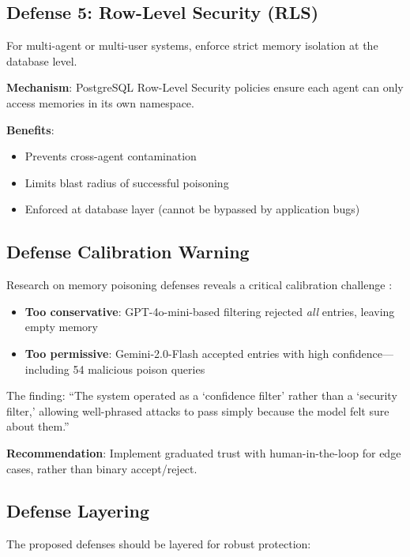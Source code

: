 \subsection{Defense 5: Row-Level Security (RLS)}

For multi-agent or multi-user systems, enforce strict memory isolation at the database level.

\textbf{Mechanism}: PostgreSQL Row-Level Security policies ensure each agent can only access memories in its own namespace.

\textbf{Benefits}:
\begin{itemize}
    \item Prevents cross-agent contamination
    \item Limits blast radius of successful poisoning
    \item Enforced at database layer (cannot be bypassed by application bugs)
\end{itemize}

\subsection{Defense Calibration Warning}

Research on memory poisoning defenses reveals a critical calibration challenge \cite{memorypoisoning2025}:

\begin{itemize}
    \item \textbf{Too conservative}: GPT-4o-mini-based filtering rejected \emph{all} entries, leaving empty memory
    \item \textbf{Too permissive}: Gemini-2.0-Flash accepted entries with high confidence---including 54 malicious poison queries
\end{itemize}

The finding: ``The system operated as a `confidence filter' rather than a `security filter,' allowing well-phrased attacks to pass simply because the model felt sure about them.''

\textbf{Recommendation}: Implement graduated trust with human-in-the-loop for edge cases, rather than binary accept/reject.

\subsection{Defense Layering}

The proposed defenses should be layered for robust protection:

